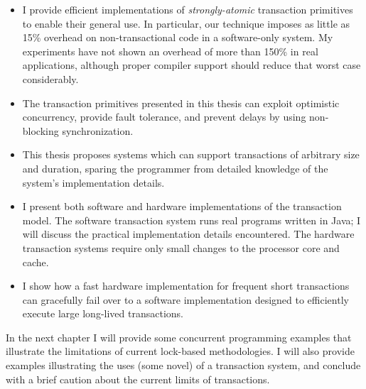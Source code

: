 \begin{itemize}
\item I provide efficient implementations of
\textit{strongly-atomic} transaction primitives to enable their general use.
In particular, our technique imposes as little as 15\% overhead on
non-transactional code in a software-only system.  My experiments have
not shown an overhead of more than 150\% in real applications,
although proper compiler support should reduce that worst case
considerably.%

\item The transaction
primitives presented in this thesis can exploit optimistic
concurrency, provide fault tolerance, and prevent delays by using
non-blocking synchronization.

\item This thesis proposes systems which can support transactions of
arbitrary size and duration, sparing the programmer from detailed
knowledge of the system's implementation details.

\item I present both software and hardware implementations of the
transaction model.
The software transaction system runs real programs written in
Java; I will discuss the practical implementation details encountered.
The hardware transaction systems require only small changes to the
processor core and cache.

\item I show how a fast hardware implementation for
frequent short transactions can gracefully fail over to a software
implementation designed to efficiently execute large long-lived
transactions.
\end{itemize}

In the next chapter I will provide some concurrent programming
examples that illustrate the limitations of current lock-based
methodologies.  I will also provide examples illustrating the uses
(some novel) of a transaction system, and conclude with a brief
caution about the current limits of transactions.

